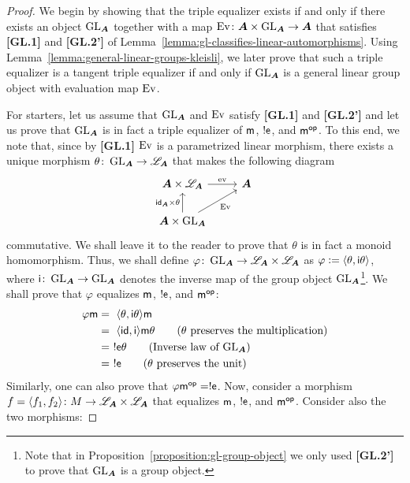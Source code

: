 \begin{proof}
We begin by showing that the triple equalizer exists if and only if there exists an object $\operatorname{GL}_{\bm{A}}$ together with a map $\operatorname{Ev}\colon{\bm{A}}\times\operatorname{GL}_{\bm{A}}\to{\bm{A}}$ that satisfies \textbf{[GL.1]} and \textbf{[GL.2']} of Lemma~\ref{lemma:gl-classifies-linear-automorphisms}. Using Lemma~\ref{lemma:general-linear-groups-kleisli}, we later prove that such a triple equalizer is a tangent triple equalizer if and only if $\operatorname{GL}_{\bm{A}}$ is a general linear group object with evaluation map $\operatorname{Ev}$.

For starters, let us assume that $\operatorname{GL}_{\bm{A}}$ and $\operatorname{Ev}$ satisfy \textbf{[GL.1]} and \textbf{[GL.2']} and let us prove that $\operatorname{GL}_{\bm{A}}$ is in fact a triple equalizer of $\mathsf{m}$, $!\mathsf{e}$, and $\mathsf{m}^{\mathsf{op}}$. To this end, we note that, since by \textbf{[GL.1]} $\operatorname{Ev}$ is a parametrized linear morphism, there exists a unique morphism $\theta\colon\operatorname{GL}_{\bm{A}}\to\mathscr{L}_{\bm{A}}$ that makes the following diagram
\begin{equation*}
\begin{tikzcd}
{\A\times\lnr_\A} & \A \\
{\A\times\GL_\A}
\arrow["\ev", from=1-1, to=1-2]
\arrow["{\id_\A\times\theta}", from=2-1, to=1-1]
\arrow["\Ev"', from=2-1, to=1-2]
\end{tikzcd}
\end{equation*}
commutative. We shall leave it to the reader to prove that $\theta$ is in fact a monoid homomorphism. Thus, we shall define $\varphi\colon\operatorname{GL}_{\bm{A}}\to\mathscr{L}_{\bm{A}}\times\mathscr{L}_{\bm{A}}$ as $\varphi\mathrel{\mathop:}=\langle\theta,\mathsf{i}\theta\rangle$, where $\mathsf{i}\colon\operatorname{GL}_{\bm{A}}\to\operatorname{GL}_{\bm{A}}$ denotes the inverse map of the group object $\operatorname{GL}_{\bm{A}}$\footnote{Note that in Proposition~\ref{proposition:gl-group-object} we only used \textbf{[GL.2']} to prove that $\operatorname{GL}_{\bm{A}}$ is a group object.}. We shall prove that $\varphi$ equalizes $\mathsf{m}$, $!\mathsf{e}$, and $\mathsf{m}^{\mathsf{op}}$:
\begin{align*}
\varphi\m &=~\<\theta,\i\theta\>\m\\
&=~\<\id,\i\>\m\theta               \tag{$\theta$ preserves the multiplication}\\
&=~!\e\theta                        \tag{Inverse law of $\GL_\A$}\\
&=~!\e                              \tag{$\theta$ preserves the unit}
\end{align*}
Similarly, one can also prove that $\varphi\mathsf{m}^{\mathsf{op}}=!\mathsf{e}$. Now, consider a morphism $f=\langle f_1,f_2\rangle\colon M\to\mathscr{L}_{\bm{A}}\times\mathscr{L}_{\bm{A}}$ that equalizes $\mathsf{m}$, $!\mathsf{e}$, and $\mathsf{m}^{\mathsf{op}}$. Consider also the two morphisms:

\end{proof}
